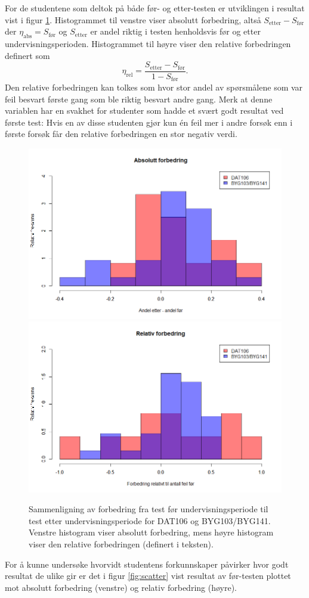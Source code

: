 \documentclass[a4paper,norsk,12pt]{article}
\begin{document}
For de studentene som deltok på både før- og etter-testen er utviklingen i resultat vist i figur \ref{fig:forbedring}. Histogrammet til venstre viser absolutt forbedring, altså $S_\text{etter}-S_\text{før}$ der $\eta_\text{abs} = S_\text{før}$ og $S_\text{etter}$ er andel riktig i testen henholdsvis før og etter undervisningsperioden. Histogrammet til høyre viser den relative forbedringen definert som
\begin{displaymath}
	\eta_\text{rel} = \frac{S_\text{etter}-S_\text{før}}{1 - S_\text{før}}.
\end{displaymath}
Den relative forbedringen kan tolkes som hvor stor andel av spørsmålene som var feil besvart første gang som ble riktig besvart andre gang. Merk at denne variablen har en svakhet for studenter som hadde et svært godt resultat ved første test: Hvis en av disse studenten gjør kun \'en feil mer i andre forsøk enn i første forsøk får den relative forbedringen en stor negativ verdi.
\begin{figure}[p]
	\includegraphics[width=.48\textwidth]{./absForbedring}
	\includegraphics[width=.48\textwidth]{./relForbedring}
	\caption{Sammenligning av forbedring fra test før undervisningsperiode til test etter undervisningsperiode for DAT106 og BYG103/BYG141. Venstre histogram viser absolutt forbedring, mens høyre histogram viser den relative forbedringen (definert i teksten). }
	\label{fig:forbedring}
\end{figure}
For å kunne undersøke hvorvidt studentens forkunnskaper påvirker hvor godt resultat de ulike gir er det i figur \ref{fig:scatter} vist resultat av før-testen plottet mot absolutt forbedring (venstre) og relativ forbedring (høyre). 
\end{document}
